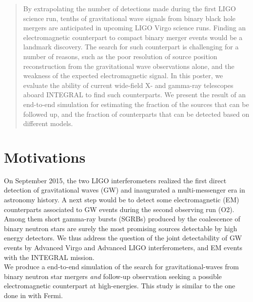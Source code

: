 \documentclass[a0,portrait]{a0poster}
\newcommand{\ECM}[1] {\textbf{\textcolor{magenta}{#1}}}
\begin{document}
\begin{multicols}{2} %


 \begin{abstract}
   By extrapolating the number of detections made during the first
   LIGO science run, tenths of gravitational wave signals from binary
   black hole mergers are anticipated in upcoming LIGO Virgo science
   runs. Finding an electromagnetic counterpart to compact binary
   merger events would be a landmark discovery. The search for such
   counterpart is challenging for a number of reasons, such as the
   poor resolution of source position reconstruction from the
   gravitational wave observations alone, and the weakness of the
   expected electromagnetic signal. In this poster, we evaluate the
   ability of current wide-field X- and gamma-ray telescopes aboard
   INTEGRAL to find such counterparts. We present the result of an
   end-to-end simulation for estimating the fraction of the sources
   that can be followed up, and the fraction of counterparts that can
   be detected based on different models.
 \end{abstract}


\section*{Motivations}

On September 2015, the two LIGO interferometers realized the first direct detection of gravitational waves (GW) and inaugurated a multi-messenger era in astronomy history. A next step would be to detect some electromagnetic (EM) counterparts associated to GW events during the second observing run (O2). Among them short gamma-ray bursts (SGRBs) produced by the coalescence of binary neutron stars are surely the most promising sources detectable by high energy detectors. We thus address the question of the joint detectability of GW events by Advanced Virgo and Advanced LIGO interferometers, and EM events with the INTEGRAL mission. \\
We produce a end-to-end simulation of the search for gravitational-waves
from binary neutron star mergers \textit{and} follow-up observation seeking a
 possible electromagnetic counterpart at high-energies. This study is similar
to the one done in \cite{2016arXiv160606124P} with Fermi.


\end{multicols}
\end{document}

